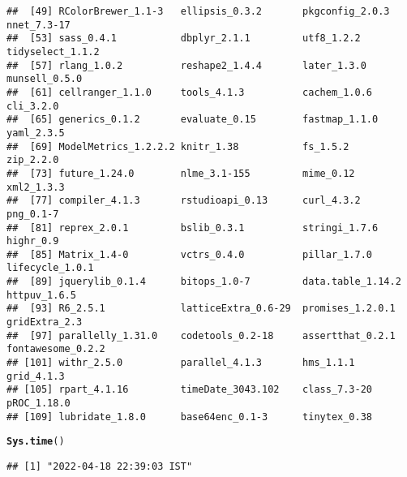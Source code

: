 \documentclass{article}\usepackage[]{graphicx}\usepackage[]{color}
\makeatletter
\newcommand{\hlstd}[1]{\textcolor[rgb]{0.345,0.345,0.345}{#1}}%
\newcommand{\hlkwd}[1]{\textcolor[rgb]{0.737,0.353,0.396}{\textbf{#1}}}%
\newenvironment{kframe}{%
 \def\at@end@of@kframe{}%
 \ifinner\ifhmode%
  \def\at@end@of@kframe{\end{minipage}}%
  \begin{minipage}{\columnwidth}%
 \fi\fi%
 \def\FrameCommand##1{\hskip\@totalleftmargin \hskip-\fboxsep
 \colorbox{shadecolor}{##1}\hskip-\fboxsep
     \hskip-\linewidth \hskip-\@totalleftmargin \hskip\columnwidth}%
 \MakeFramed {\advance\hsize-\width
   \@totalleftmargin\z@ \linewidth\hsize
   \@setminipage}}%
 {\par\unskip\endMakeFramed%
 \at@end@of@kframe}
\newenvironment{knitrout}{}{} %
\makeatother
\begin{document}
\begin{knitrout}
\begin{kframe}
\begin{verbatim}
##  [49] RColorBrewer_1.1-3   ellipsis_0.3.2       pkgconfig_2.0.3      nnet_7.3-17         
##  [53] sass_0.4.1           dbplyr_2.1.1         utf8_1.2.2           tidyselect_1.1.2    
##  [57] rlang_1.0.2          reshape2_1.4.4       later_1.3.0          munsell_0.5.0       
##  [61] cellranger_1.1.0     tools_4.1.3          cachem_1.0.6         cli_3.2.0           
##  [65] generics_0.1.2       evaluate_0.15        fastmap_1.1.0        yaml_2.3.5          
##  [69] ModelMetrics_1.2.2.2 knitr_1.38           fs_1.5.2             zip_2.2.0           
##  [73] future_1.24.0        nlme_3.1-155         mime_0.12            xml2_1.3.3          
##  [77] compiler_4.1.3       rstudioapi_0.13      curl_4.3.2           png_0.1-7           
##  [81] reprex_2.0.1         bslib_0.3.1          stringi_1.7.6        highr_0.9           
##  [85] Matrix_1.4-0         vctrs_0.4.0          pillar_1.7.0         lifecycle_1.0.1     
##  [89] jquerylib_0.1.4      bitops_1.0-7         data.table_1.14.2    httpuv_1.6.5        
##  [93] R6_2.5.1             latticeExtra_0.6-29  promises_1.2.0.1     gridExtra_2.3       
##  [97] parallelly_1.31.0    codetools_0.2-18     assertthat_0.2.1     fontawesome_0.2.2   
## [101] withr_2.5.0          parallel_4.1.3       hms_1.1.1            grid_4.1.3          
## [105] rpart_4.1.16         timeDate_3043.102    class_7.3-20         pROC_1.18.0         
## [109] lubridate_1.8.0      base64enc_0.1-3      tinytex_0.38
\end{verbatim}
\begin{alltt}
\hlkwd{Sys.time}\hlstd{()}
\end{alltt}
\begin{verbatim}
## [1] "2022-04-18 22:39:03 IST"
\end{verbatim}
\end{kframe}
\end{knitrout}
\end{document}
